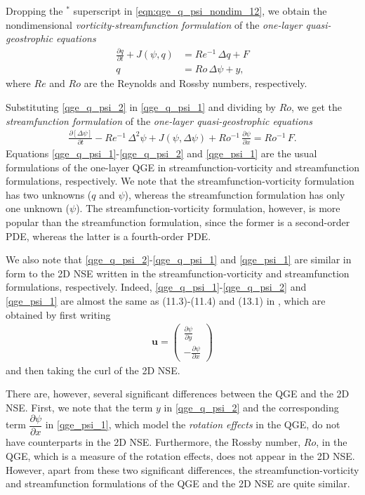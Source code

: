 Dropping the $^*$ superscript in \eqref{eqn:qge_q_psi_nondim_12}, we obtain the
nondimensional {\it vorticity-streamfunction formulation} of the \emph{one-layer
quasi-geostrophic equations}
\begin{align}
  \frac{\partial q}{\partial t} + J(\psi , q) &= Re^{-1} \, \Delta q + F \label{qge_q_psi_1} \\
  q &= Ro \, \Delta \psi + y, \label{qge_q_psi_2}
\end{align}
where $Re$ and $Ro$ are the Reynolds and Rossby numbers, respectively.

Substituting \eqref{qge_q_psi_2} in \eqref{qge_q_psi_1} and dividing by $Ro$, we
get the {\it streamfunction formulation} of the \emph{one-layer quasi-geostrophic
equations}
\begin{align}
  \frac{\partial \left[ \Delta \psi \right]}{\partial t} - Re^{-1} \, \Delta^2 \psi + J(\psi
    , \Delta \psi) + Ro^{-1} \, \frac{\partial \psi}{\partial x} = Ro^{-1} \, F. \label{qge_psi_1}
\end{align}
Equations \eqref{qge_q_psi_1}-\eqref{qge_q_psi_2} and \eqref{qge_psi_1} are the
usual formulations of the one-layer QGE in streamfunction-vorticity and
streamfunction formulations, respectively. We note that the
streamfunction-vorticity formulation has two unknowns ($q$ and $\psi$), whereas
the streamfunction formulation has only one unknown ($\psi$). The
streamfunction-vorticity formulation, however, is more popular than the
streamfunction formulation, since the former is a second-order PDE, whereas the
latter is a fourth-order PDE.

We also note that \eqref{qge_q_psi_2}-\eqref{qge_q_psi_1} and \eqref{qge_psi_1}
are similar in form to the 2D NSE written in the streamfunction-vorticity and
streamfunction formulations, respectively.  Indeed,
\eqref{qge_q_psi_1}-\eqref{qge_q_psi_2} and \eqref{qge_psi_1} are almost the
same as (11.3)-(11.4) and (13.1) in \cite{Gunzburger89}, which are obtained by
first writing
\begin{align}
  \mathbf{u} = \begin{pmatrix} \frac{\partial \psi}{\partial y} \\[0.2cm]
      - \frac{\partial \psi}{\partial x}
    \end{pmatrix} \label{qge_psi_2}
\end{align}
and then taking the curl of the 2D NSE.

There are, however, several significant differences between the QGE and the 2D
NSE. First, we note that the term $y$ in \eqref{qge_q_psi_2} and the
corresponding term $\dfrac{\partial \psi}{\partial x}$ in \eqref{qge_psi_1},
which model the \emph{rotation effects} in the QGE, do not have counterparts in
the 2D NSE.  Furthermore, the Rossby number, $Ro$, in the QGE, which is a
measure of the rotation effects, does not appear in the 2D NSE.  However, apart
from these two significant differences, the streamfunction-vorticity and
streamfunction formulations of the QGE and the 2D NSE are quite similar.

